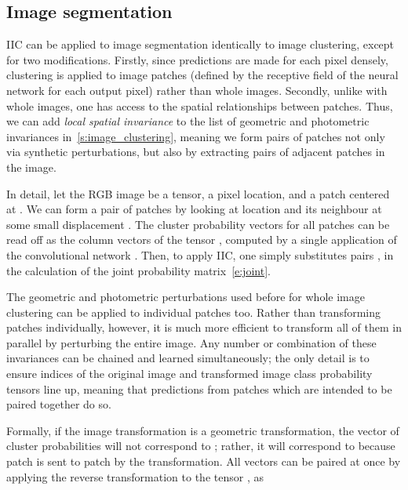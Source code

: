 \documentclass[10pt,twocolumn,letterpaper]{article}
\newcommand{\methodnameshort}{IIC\xspace}
\begin{document}
\subsection{Image segmentation}\label{s:image_segmentation}

\methodnameshort can be applied to image segmentation identically to image clustering, except for two modifications.
Firstly, since predictions are made for each pixel densely, clustering is applied to image patches (defined by the receptive field of the neural network for each output pixel) rather than whole images.
Secondly, unlike with whole images, one has access to the spatial relationships between patches.
Thus, we can add \emph{local spatial invariance} to the list of geometric and photometric invariances in~\cref{s:image_clustering}, meaning we form pairs of patches not only via synthetic perturbations, but also by extracting pairs of adjacent patches in the image.





In detail, let the RGB image  be a tensor,  a pixel location, and  a patch centered at .
We can form a pair of patches  by looking at location  and its neighbour  at some small displacement .
The cluster probability vectors for all patches  can be read off as the column vectors  of the tensor , computed by a single application of the convolutional network .
Then, to apply \methodnameshort, one simply substitutes pairs ,  in the calculation of the joint probability matrix~\eqref{e:joint}.







The geometric and photometric perturbations used before for whole image clustering can be applied to individual patches too.
Rather than transforming patches individually, however, it is much more efficient to transform all of them in parallel by perturbing the entire image.
Any number or combination of these invariances can be chained and learned simultaneously; the only detail is to ensure indices of the original image and transformed image class probability tensors line up, meaning that predictions from patches which are intended to be paired together do so.

Formally, if the image transformation  is a geometric transformation, the vector of cluster probabilities  will not correspond to ; rather, it will correspond to  because patch  is sent to patch  by the transformation.
All vectors can be paired at once by applying the reverse transformation  to the tensor , as
\end{document}
